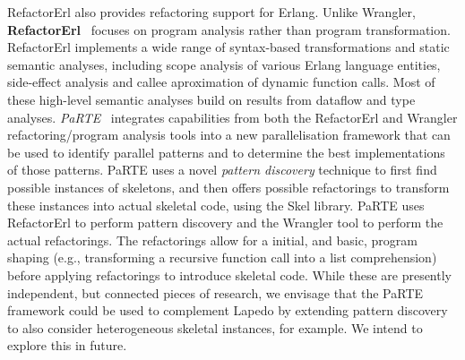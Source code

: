 \documentclass[final]{jfp1}
\newcommand{\lapedo}{\xspace{\sc Lapedo}\xspace}
\newcommand{\Lapedo}{\lapedo}
\begin{document}




RefactorErl also provides refactoring support for Erlang.
Unlike Wrangler, \textbf{RefactorErl}~\cite{refactorerl} focuses on program
analysis rather than program transformation. RefactorErl implements a wide
range of syntax-based transformations and static semantic analyses,
including scope analysis of various Erlang language entities, side-effect
analysis and callee aproximation of dynamic function calls. Most of these
high-level semantic analyses build on results from dataflow and type
analyses.
%
\emph{PaRTE}~\cite{Bozo} integrates capabilities from both the
RefactorErl and Wrangler refactoring/program analysis tools into a new
parallelisation framework that can be used to identify parallel patterns
and to determine the best implementations of those patterns. PaRTE uses a
novel \emph{pattern discovery} technique to first find possible instances
of skeletons, and then offers possible refactorings to transform these
instances into actual skeletal code, using the Skel library. PaRTE uses
RefactorErl to perform pattern discovery and the
Wrangler tool to perform the actual refactorings. The refactorings allow
for a initial, and basic, program shaping (e.g., transforming a
recursive function call into a list comprehension) before applying
refactorings to introduce skeletal code.  While these are presently independent,
but connected pieces of research, we envisage that the PaRTE
framework could be used to complement \Lapedo{} by extending pattern
discovery to also consider heterogeneous skeletal instances, for example.
We intend to explore this in future.
\end{document}
